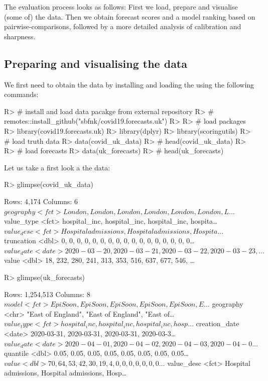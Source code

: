 \documentclass[article,shortnames]{jss}
\begin{document}
The evaluation process looks as follows: First we load, prepare and visualise (some of) the data. Then we obtain forecast scores and a model ranking based on pairwise-comparisons, followed by a more detailed analysis of calibration and sharpness. 

\subsection{Preparing and visualising the data}

We first need to obtain the data by installing and loading the  using the following commands: 
% 
\begin{Schunk}
\begin{Sinput}
R> # install and load data pacakge from external repository
R> # remotes::install_github("sbfnk/covid19.forecasts.uk")
R> 
R> # load packages
R> library(covid19.forecasts.uk)
R> library(dplyr)
R> library(scoringutils)
R> # load truth data
R> data(covid_uk_data)
R> # head(covid_uk_data)
R> 
R> # load forecasts
R> data(uk_forecasts)
R> # head(uk_forecasts)
\end{Sinput}
\end{Schunk}
% 
Let us take a first look a the data:
% 
\begin{Schunk}
\begin{Sinput}
R> glimpse(covid_uk_data)
\end{Sinput}
\begin{Soutput}
Rows: 4,174
Columns: 6
$ geography  <fct> London, London, London, London, London, London, L…
$ value_type <fct> hospital_inc, hospital_inc, hospital_inc, hospita…
$ value_desc <fct> Hospital admissions, Hospital admissions, Hospita…
$ truncation <dbl> 0, 0, 0, 0, 0, 0, 0, 0, 0, 0, 0, 0, 0, 0, 0, 0, 0…
$ value_date <date> 2020-03-20, 2020-03-21, 2020-03-22, 2020-03-23, …
$ value      <dbl> 18, 232, 280, 241, 313, 353, 516, 637, 677, 546, …
\end{Soutput}
\begin{Sinput}
R> glimpse(uk_forecasts)
\end{Sinput}
\begin{Soutput}
Rows: 1,254,513
Columns: 8
$ model         <fct> EpiSoon, EpiSoon, EpiSoon, EpiSoon, EpiSoon, E…
$ geography     <chr> "East of England", "East of England", "East of…
$ value_type    <fct> hospital_inc, hospital_inc, hospital_inc, hosp…
$ creation_date <date> 2020-03-31, 2020-03-31, 2020-03-31, 2020-03-3…
$ value_date    <date> 2020-04-01, 2020-04-02, 2020-04-03, 2020-04-0…
$ quantile      <dbl> 0.05, 0.05, 0.05, 0.05, 0.05, 0.05, 0.05, 0.05…
$ value         <dbl> 70, 64, 53, 42, 30, 19, 4, 0, 0, 0, 0, 0, 0, 0…
$ value_desc    <fct> Hospital admissions, Hospital admissions, Hosp…
\end{Soutput}
\end{Schunk}
\end{document}
